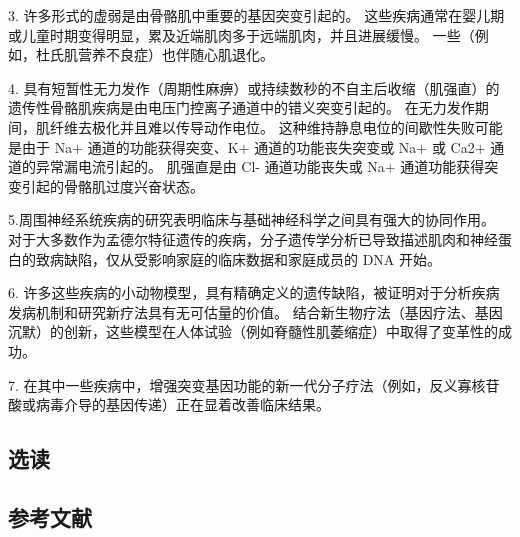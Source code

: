 3. 许多形式的虚弱是由骨骼肌中重要的基因突变引起的。 这些疾病通常在婴儿期或儿童时期变得明显，累及近端肌肉多于远端肌肉，并且进展缓慢。 一些（例如，杜氏肌营养不良症）也伴随心肌退化。 

4. 具有短暂性无力发作（周期性麻痹）或持续数秒的不自主后收缩（肌强直）的遗传性骨骼肌疾病是由电压门控离子通道中的错义突变引起的。 在无力发作期间，肌纤维去极化并且难以传导动作电位。 这种维持静息电位的间歇性失败可能是由于 Na+ 通道的功能获得突变、K+ 通道的功能丧失突变或 Na+ 或 Ca2+ 通道的异常漏电流引起的。 肌强直是由 Cl- 通道功能丧失或 Na+ 通道功能获得突变引起的骨骼肌过度兴奋状态。 

5.周围神经系统疾病的研究表明临床与基础神经科学之间具有强大的协同作用。 对于大多数作为孟德尔特征遗传的疾病，分子遗传学分析已导致描述肌肉和神经蛋白的致病缺陷，仅从受影响家庭的临床数据和家庭成员的 DNA 开始。 

6. 许多这些疾病的小动物模型，具有精确定义的遗传缺陷，被证明对于分析疾病发病机制和研究新疗法具有无可估量的价值。 结合新生物疗法（基因疗法、基因沉默）的创新，这些模型在人体试验（例如脊髓性肌萎缩症）中取得了变革性的成功。 

7. 在其中一些疾病中，增强突变基因功能的新一代分子疗法（例如，反义寡核苷酸或病毒介导的基因传递）正在显着改善临床结果。
\subsection{选读}
\subsection{参考文献}
